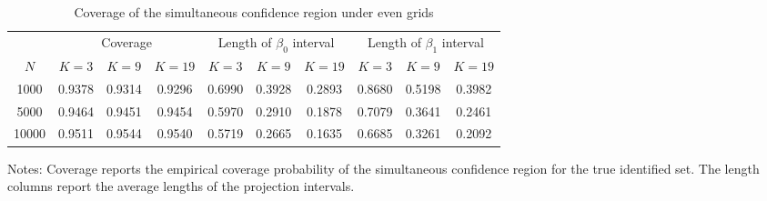\begin{table}[H]
\centering
\begin{threeparttable}[H]
\centering
\caption{\label{tab:partial_identification_region_coverage_even} Coverage of the simultaneous confidence region under even grids}
\centering
{
\renewcommand{\arraystretch}{1.8}
\begin{tabular}[t]{cccccccccc}
\toprule
\multicolumn{1}{c}{ } & \multicolumn{3}{c}{Coverage} & \multicolumn{3}{c}{Length of $\beta_0$ interval} & \multicolumn{3}{c}{Length of $\beta_1$ interval} \\
\cmidrule(l{3pt}r{3pt}){2-4} \cmidrule(l{3pt}r{3pt}){5-7} \cmidrule(l{3pt}r{3pt}){8-10}
$N$ & $K = 3$ & $K = 9$ & $K = 19$ & $K = 3$ & $K = 9$ & $K = 19$ & $K = 3$ & $K = 9$ & $K = 19$\\
\midrule
1000 & 0.9378 & 0.9314 & 0.9296 & 0.6990 & 0.3928 & 0.2893 & 0.8680 & 0.5198 & 0.3982\\
5000 & 0.9464 & 0.9451 & 0.9454 & 0.5970 & 0.2910 & 0.1878 & 0.7079 & 0.3641 & 0.2461\\
10000 & 0.9511 & 0.9544 & 0.9540 & 0.5719 & 0.2665 & 0.1635 & 0.6685 & 0.3261 & 0.2092\\
\bottomrule
\end{tabular}
}
\begin{tablenotes}[flushleft]
{}
\item Notes: Coverage reports the empirical coverage probability of the simultaneous confidence region for the true identified set. The length columns report the average lengths of the projection intervals.
\end{tablenotes}
\end{threeparttable}
\end{table}